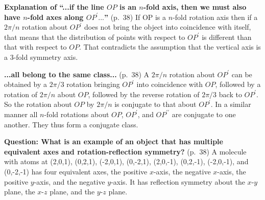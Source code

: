 {\bf Explanation of ``...if the line $OP$ is an $n$-fold axis, then we
  must also have $n$-fold axes along $OP^\prime...$''} (p.\ 38) If OP
is a $n$-fold rotation axis then if a $2\pi/n$ rotation about $OP^\prime$
does not bring the object into coincidence with itself, that means
that the distribution of points with respect to $OP^\prime$ is
different than that with respect to $OP$. That contradicts the
assumption that the vertical axis is a 3-fold symmetry axis.

{\bf ...all belong to the same class...} (p.\ 38) A $2\pi/n$ rotation about
$OP^\prime$ can be obtained by a $2\pi/3$ rotation bringing $OP^\prime$ into
coincidence with $OP$, followed by a rotation of $2\pi/n$ about $OP$,
followed by the reverse rotation of $2\pi/3$ back to $OP^\prime$. So the
rotation about $OP$ by $2\pi/n$ is conjugate to that about $OP^\prime$. In a
similar manner all $n$-fold rotations about $OP$, $OP^\prime$, and
$OP^{\prime\prime}$ are conjugate to one another. They thus form a
conjugate class.

{\bf Question: What is an example of an object that has multiple equivalent axes and rotation-reflection symmetry?} (p.\ 38)
A molecule with atoms at (2,0,1), (0,2,1), (-2,0,1), (0,-2,1), (2,0,-1), (0,2,-1), (-2,0,-1), and (0,-2,-1) has four equivalent axes, the positive $x$-axis, the negative $x$-axis, the positive $y$-axis, and the negative $y$-axis. It has reflection symmetry about the $x$-$y$ plane, the $x$-$z$ plane, and the $y$-$z$ plane.
